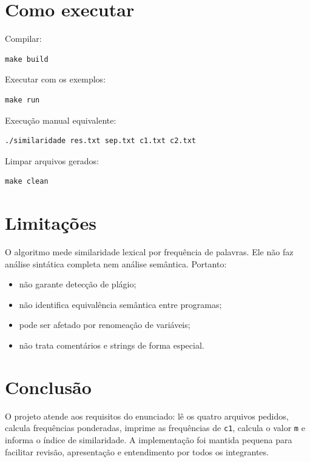 \documentclass[12pt,a4paper]{article}
\newcommand{\arquivo}[1]{\texttt{#1}}
\begin{document}
\section{Como executar}

Compilar:

\begin{lstlisting}
make build
\end{lstlisting}

Executar com os exemplos:

\begin{lstlisting}
make run
\end{lstlisting}

Execução manual equivalente:

\begin{lstlisting}
./similaridade res.txt sep.txt c1.txt c2.txt
\end{lstlisting}

Limpar arquivos gerados:

\begin{lstlisting}
make clean
\end{lstlisting}

\section{Limitações}

O algoritmo mede similaridade lexical por frequência de palavras. Ele não faz análise sintática completa nem análise semântica. Portanto:

\begin{itemize}[leftmargin=1.2cm]
    \item não garante detecção de plágio;
    \item não identifica equivalência semântica entre programas;
    \item pode ser afetado por renomeação de variáveis;
    \item não trata comentários e strings de forma especial.
\end{itemize}

\section{Conclusão}

O projeto atende aos requisitos do enunciado: lê os quatro arquivos pedidos, calcula frequências ponderadas, imprime as frequências de \arquivo{c1}, calcula o valor \arquivo{m} e informa o índice de similaridade. A implementação foi mantida pequena para facilitar revisão, apresentação e entendimento por todos os integrantes.
\end{document}
